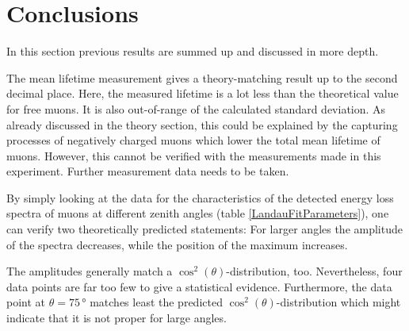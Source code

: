 \section{Conclusions}

In this section previous results are summed up and discussed in more depth.

The mean lifetime measurement gives a theory-matching result up to the second decimal place.
Here, the measured lifetime is a lot less than the theoretical value for free muons.
It is also out-of-range of the calculated standard deviation.
As already discussed in the theory section, this could be explained by the capturing processes of negatively charged muons which lower the total mean lifetime of muons.
However, this cannot be verified with the measurements made in this experiment.
Further measurement data needs to be taken.

By simply looking at the data for the characteristics of the detected energy loss spectra of muons at different zenith angles (table \ref{LandauFitParameters}), one can verify two theoretically predicted statements: For larger angles the amplitude of the spectra decreases, while the position of the maximum increases. 

The amplitudes generally match a $\cos^2 (\theta)$-distribution, too.
Nevertheless, four data points are far too few to give a statistical evidence.
Furthermore, the data point at $\theta = 75\,$° matches least the predicted $\cos^2 (\theta)$-distribution which might indicate that it is not proper for large angles.
	 
